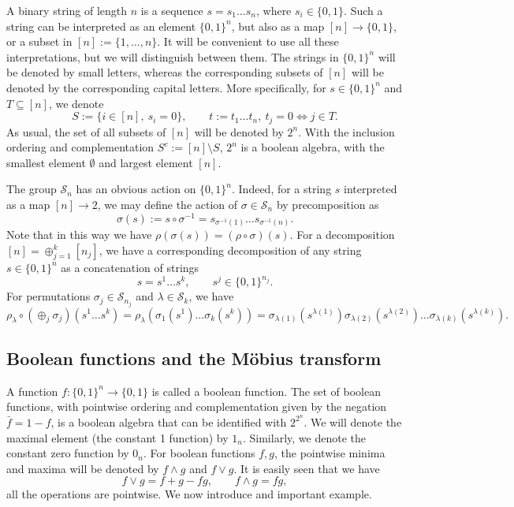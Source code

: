 \documentclass[12pt]{article}
\theoremstyle{definition}
\theoremstyle{remark}
\def\permut{\mathscr{S}}
\begin{document}
A binary string of length $n$ is a sequence  $s=s_1\dots s_n$, where $s_i\in
\{0,1\}$. Such a string can be interpreted as an element $\{0,1\}^n$, but also as a 
map $[n]\to \{0,1\}$, or a subset in  $[n]:=\{1,\dots,n\}$. It will be convenient to use
all these interpretations, but we will distinguish between them. The strings in
$\{0,1\}^n$ will be denoted by small letters, whereas the corresponding subsets of $[n]$
will be denoted by the corresponding capital letters. More specifically, for $s\in \{0,1\}^n$ and 
$T\subseteq [n]$, we denote
\begin{equation}\label{eq:string_subset}
S:=\{i\in [n],\ s_i=0\},\qquad t:=t_1\dots t_n,\ t_j=0 \iff j\in T.
\end{equation}
As usual, the set of all subsets of $[n]$ will be denoted by $2^n$. 
With the inclusion ordering and complementation $S^c:=[n]\setminus S$,
$2^n$ is a boolean algebra, with the smallest element $\emptyset$ and largest element
$[n]$.  

The group $\permut_n$ has an obvious action on $\{0,1\}^n$. Indeed,
 for a string $s$  interpreted as a map $[n]\to 2$, we may define the action of
$\sigma\in \permut_n$ by precomposition as
\[
\sigma(s):=s\circ\sigma^{-1}=s_{\sigma^{-1}(1)}\dots s_{\sigma^{-1}(n)}.
\]
Note that in this way we have $\rho(\sigma(s))=(\rho\circ \sigma)(s)$. For a decomposition
$[n]=\oplus_{j=1}^k[n_j]$, we have a corresponding decomposition of
any string $s\in \{0,1\}^n$ as a concatenation of strings
\[
s=s^1\dots s^k,\qquad s^j\in \{0,1\}^{n_j}.
\]
For permutations $\sigma_j\in \permut_{n_j}$ and  $\lambda\in
\permut_k$, we have
\[
\rho_\lambda\circ(\oplus_j\sigma_j)(s^1\dots s^k)=\rho_\lambda(\sigma_1(s^1)\dots
\sigma_k(s^k))=\sigma_{\lambda(1)}(s^{\lambda(1)})\sigma_{\lambda(2)}(s^{\lambda(2)})\dots
\sigma_{\lambda(k)}(s^{\lambda(k)}).
\]





\subsection{Boolean functions and the  M\"obius transform}


A function $f:\{0,1\}^n\to \{0,1\}$ is called a boolean function. 
The set of boolean functions, with pointwise ordering and complementation given by the
negation $\bar f=1-f$,  is a boolean algebra that can be identified with $2^{2^n}$.
We will denote the maximal element (the constant 1 function) by $1_n$. Similarly,
we denote the constant zero function by $0_n$.  For boolean
functions $f,g$, the pointwise minima and maxima will be denoted by $f\wedge g$ and $f\vee
g$. It is easily seen that we have
\begin{equation}\label{eq:wedgevee_fun}
f\vee g= f+g-fg,\qquad f\wedge g=fg,
\end{equation}
all the operations are pointwise. We now introduce and important example. 
\end{document}
